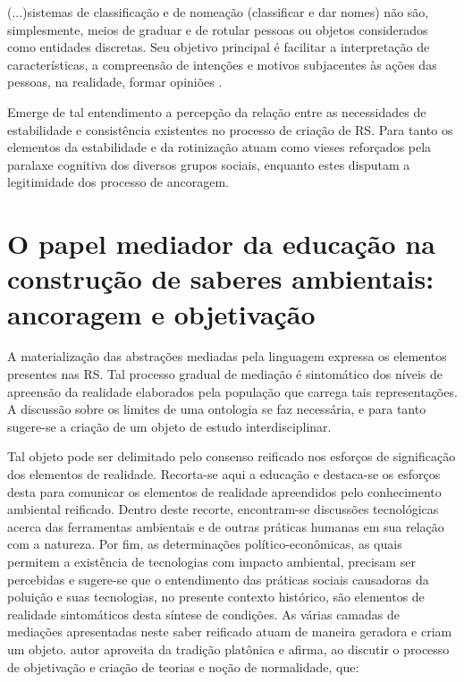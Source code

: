 \documentclass[
  12pt,       %
  openright,      %
  twoside,      %
  a4paper,      %
  english,      %
  french,       %
  spanish,      %
  brazil        %
  ]{abntex2}
\begin{document}
\begin{citacao}
(...)sistemas de classificação e de nomeação
(classificar e dar nomes) não são, simplesmente, meios de graduar
e de rotular pessoas ou objetos considerados como entidades 
discretas. Seu objetivo principal é facilitar a interpretação de 
características, a compreensão de intenções e motivos subjacentes às
ações das pessoas, na realidade, formar opiniões \cite[p.70]{Representacees_sociais_moscovici}.
\end{citacao}


Emerge de tal entendimento a percepção da relação entre as necessidades de estabilidade e consistência existentes no processo de criação de RS. Para tanto os elementos da estabilidade e da rotinização atuam como vieses reforçados pela paralaxe cognitiva dos diversos grupos sociais, enquanto estes disputam a legitimidade dos processo de ancoragem.


\section{O papel mediador da educação na construção de saberes ambientais: ancoragem e objetivação}

A materialização das abstrações mediadas pela linguagem expressa os elementos presentes nas RS. Tal processo gradual de mediação é sintomático dos níveis de apreensão da realidade elaborados pela população que carrega tais representações. A discussão sobre os limites de uma ontologia se faz necessária, e para tanto sugere-se a criação de um objeto de estudo interdisciplinar.

Tal objeto pode ser delimitado pelo consenso reificado nos esforços de significação dos elementos de realidade. Recorta-se aqui a educação e destaca-se os esforços desta para comunicar os elementos de realidade apreendidos pelo conhecimento ambiental reificado. Dentro deste recorte, encontram-se discussões tecnológicas acerca das ferramentas ambientais e de outras práticas humanas em sua relação com a natureza. Por fim, as determinações político-econômicas, as quais permitem a existência de tecnologias com impacto ambiental, precisam ser percebidas e sugere-se que o entendimento das práticas sociais causadoras da poluição e suas tecnologias, no presente contexto histórico, são elementos de realidade sintomáticos desta síntese de condições. As várias camadas de mediações apresentadas neste saber reificado atuam de maneira geradora e criam um objeto.  autor aproveita da tradição platônica e afirma, ao discutir o processo de objetivação e criação de teorias e noção de normalidade, que:
\end{document}
